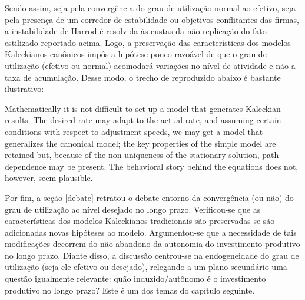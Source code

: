 Sendo assim, seja pela convergência do grau de utilização normal ao efetivo, seja pela presença de um corredor de estabilidade ou objetivos conflitantes das firmas, a instabilidade de Harrod é resolvida às custas da não replicação do fato estilizado reportado acima. Logo, a preservação das características dos modelos Kaleckianos canônicos impôs a hipótese pouco razoável de que o grau de utilização (efetivo ou normal) acomodará variações no nível de atividade e não a taxa de acumulação. Desse modo, o trecho de \textcite[p.~135]{skott_theoretical_2012} reproduzido abaixo é bastante ilustrativo:

\begin{citacao}
Mathematically it is not difficult to set up a model that generates Kaleckian results. The desired rate may adapt to the actual rate, and assuming
certain conditions with respect to adjustment speeds, we may get a model that
generalizes the canonical model; the key properties of the simple model are
retained but, because of the non-uniqueness of the stationary solution, path
dependence may be present. The behavioral story behind the equations does
not, however, seem plausible.
\end{citacao}

Por fim, a seção \ref{debate} retratou o debate entorno da convergência (ou não) do grau de utilização ao nível desejado no longo prazo. Verificou-se que as características dos modelos Kaleckianos tradicionais são preservadas se são adicionadas novas hipóteses ao modelo. Argumentou-se que a necessidade de tais modificações decorrem do não abandono da autonomia do investimento produtivo no longo prazo. Diante disso, a discussão centrou-se na endogeneidade do grau de utilização (seja ele efetivo ou desejado), relegando a um plano secundário uma questão igualmente relevante: quão induzido/autônomo é o investimento produtivo no longo prazo? Este é um dos temas do capítulo seguinte.


